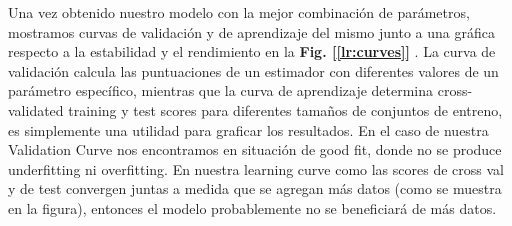 \documentclass[12pt,twoside]{report}
\begin{document}
Una vez obtenido nuestro modelo con la mejor combinación de parámetros, mostramos curvas de validación y de aprendizaje del mismo junto a una gráfica respecto a la estabilidad y el rendimiento en la \textbf{Fig. [\ref{lr:curves}]} . La curva de validación calcula las puntuaciones de un estimador con diferentes valores de un parámetro específico, mientras que la curva de aprendizaje determina cross-validated training y test scores para diferentes tamaños de conjuntos de entreno, es simplemente una utilidad para graficar los resultados.
En el caso de nuestra Validation Curve nos encontramos en situación de good fit, donde no se produce underfitting ni overfitting. En nuestra learning curve como las scores de cross val y de test convergen juntas a medida que se agregan más datos (como se muestra en la figura), entonces el modelo probablemente no se beneficiará de más datos.
\end{document}
